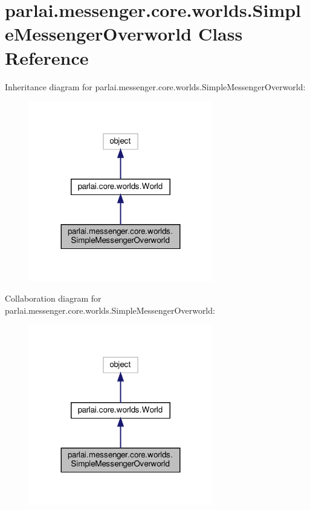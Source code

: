 \hypertarget{classparlai_1_1messenger_1_1core_1_1worlds_1_1SimpleMessengerOverworld}{}\section{parlai.\+messenger.\+core.\+worlds.\+Simple\+Messenger\+Overworld Class Reference}
\label{classparlai_1_1messenger_1_1core_1_1worlds_1_1SimpleMessengerOverworld}


Inheritance diagram for parlai.\+messenger.\+core.\+worlds.\+Simple\+Messenger\+Overworld\+:
\nopagebreak
\begin{figure}[H]
\begin{center}
\leavevmode
\includegraphics[width=227pt]{classparlai_1_1messenger_1_1core_1_1worlds_1_1SimpleMessengerOverworld__inherit__graph}
\end{center}
\end{figure}


Collaboration diagram for parlai.\+messenger.\+core.\+worlds.\+Simple\+Messenger\+Overworld\+:
\nopagebreak
\begin{figure}[H]
\begin{center}
\leavevmode
\includegraphics[width=227pt]{classparlai_1_1messenger_1_1core_1_1worlds_1_1SimpleMessengerOverworld__coll__graph}
\end{center}
\end{figure}

